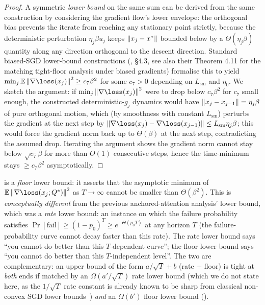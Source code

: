 \begin{proof}
A symmetric \emph{lower bound} on the same sum can be derived from the
same construction by considering the gradient flow's lower envelope: the
orthogonal bias prevents the iterate from reaching any stationary point
strictly, because the deterministic perturbation $\eta_j \beta u_j$ keeps
$\left\| x_j - x^* \right\|$ bounded below by a $\Theta(\eta_j \beta)$ quantity
along any direction orthogonal to the descent direction. Standard
biased-SGD lower-bound constructions
(\cite{bottou2018optimization}, \S 4.3, see also their Theorem 4.11 for
the matching tight-floor analysis under biased gradients) formalise this
to yield $\min_j \E \norm{\nabla \loss(x_j)}^2 \ge c_7 \beta^2$ for some
$c_7 > 0$ depending on $L_{\mathrm{sm}}$ and $\eta_0$. We sketch the
argument: if $\min_j \norm{\nabla \loss(x_j)}^2$ were to drop below $c_7 \beta^2$
for $c_7$ small enough, the constructed deterministic-$g_j$ dynamics
would have $\left\| x_j - x_{j-1} \right\| = \eta_j \beta$ of pure orthogonal
motion, which (by smoothness with constant $L_{\mathrm{sm}}$) perturbs
the gradient at the next step by
$\norm{\nabla \loss(x_j) - \nabla \loss(x_{j-1})} \le L_{\mathrm{sm}} \eta_j \beta$;
this would force the gradient norm back up to $\Theta(\beta)$ at the
next step, contradicting the assumed drop. Iterating the argument shows
the gradient norm cannot stay below $\sqrt{c_7} \beta$ for more than
$O(1)$ consecutive steps, hence the time-minimum stays $\ge c_7 \beta^2$
asymptotically. 
\end{proof}

\begin{remark}\label{rem:floor_vs_rate_lower_bound}
 is a \emph{floor} lower bound: it asserts that
the asymptotic minimum of $\E \norm{\nabla \loss(x_j; Q^*)}^2$ as
$T \to \infty$ cannot be smaller than $\Theta(\beta^2)$. This is
\emph{conceptually different} from the previous anchored-attention
analysis' lower bound, which was a \emph{rate} lower bound: an instance
on which the failure probability satisfies
$\Pr[\text{fail}] \ge (1 - p_0)^T \ge e^{-\Theta(p_0 T)}$ at any horizon
$T$ (the failure-probability curve cannot decay faster than this rate).
The rate lower bound says ``you cannot do better than this $T$-dependent
curve''; the floor lower bound says ``you cannot do better than this
$T$-independent level''. The two are complementary: an upper bound of
the form $a/\sqrt T + b$ (rate + floor) is tight at \emph{both} ends if
matched by an $\Omega(a'/\sqrt T)$ rate lower bound (which we do not
state here, as the $1/\sqrt T$ rate constant is already known to be
sharp from classical non-convex SGD lower bounds~\cite{bottou2018optimization})
\emph{and} an $\Omega(b')$ floor lower bound ().
\end{remark}

